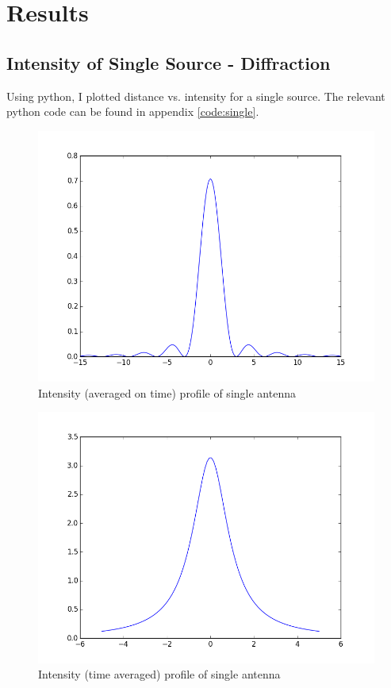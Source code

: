 \chapter{Results}

\section{Intensity of Single Source - Diffraction}

Using python, I plotted distance vs. intensity for a single source. The relevant python code can be found in appendix \ref{code:single}.

\begin{figure}[!h]
\centering	
\includegraphics[scale=0.45]{figure_1.png}
\caption{Intensity (averaged on time) profile of single antenna}
\end{figure}

\begin{figure}[!h]
\centering	
\includegraphics[scale=0.45]{figure_5.png}
\caption{Intensity (time averaged) profile of single antenna}
\end{figure}

